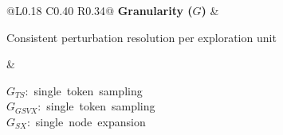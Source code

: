 \documentclass[review,12pt]{elsarticle}
\newcommand{\nowrap}[1]{\mbox{#1}}
\begin{document}
\begin{table}[H]
\begin{tabular}{@{}L{0.18\textwidth} C{0.40\textwidth} R{0.34\textwidth}@{}}
\textbf{Granularity ($G$)} &
\begin{minipage}[c]{0.40\textwidth}\centering
Consistent perturbation resolution per exploration unit
\end{minipage} &
\begin{minipage}[c]{0.34\textwidth}\centering
\nowrap{$G_{TS}$: single token sampling}\\
\nowrap{$G_{GSVX}$: single token sampling}\\
\nowrap{$G_{SX}$: single node expansion}
\end{minipage}\\[0.6em]
\bottomrule
\end{tabular}

\caption{Common budget, sparsity and receptive field across explainers (TS: TokenSHAP; GSVX: GraphSVX; SX: SubgraphX). Every configuration shares the same evaluation depth and perturbation resolution, so that differences between explanations can be attributed to the explainer or to the representation.}
\label{tab:fairness}
\end{table}
\end{document}
